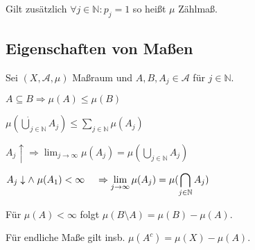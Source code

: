 Gilt zusätzlich $\forall j \in \mathbb{N} : p_j = 1$ so heißt $\mu$ Zählmaß.

\subsection*{Eigenschaften von Maßen}

Sei $(X, \mathcal{A}, \mu)$ Maßraum und $A, B, A_j \in \mathcal{A}$ für $j \in \mathbb{N}$.

\begin{description}[leftmargin=!,labelwidth=26mm]
	\item[Monotonie] $A \subseteq B \Rightarrow \mu(A) \leq \mu(B)$
	\item[$\sigma$-Subadditivität] $\mu(\dot\bigcup_{j\in \mathbb{N}} A_j) \leq \sum_{j\in \mathbb{N}} \mu(A_j)$
	\item[Stetigkeit (unten)] $A_j \uparrow \Rightarrow \displaystyle\lim_{j\to \infty} \mu(A_j) = \mu(\bigcup_{j\in \mathbb{N}} A_j)$
	\item[Stetigkeit (oben)] $A_j \downarrow \land \hspace*{1mm} \mu(A_1) < \infty \\ \hspace*{4mm}\Rightarrow \displaystyle\lim_{j\to \infty} \mu(A_j) = \mu(\bigcap_{j\in \mathbb{N}} A_j)$
\end{description}

Für $\mu(A) < \infty$ folgt $\mu(B\setminus A) = \mu(B) - \mu(A)$.

Für endliche Maße gilt insb. $\mu(A^c) = \mu(X) - \mu(A)$.
